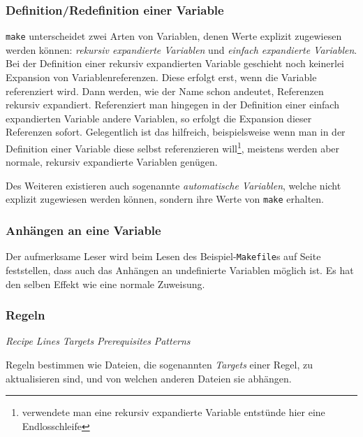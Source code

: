 	\subsubsection*{Definition/Redefinition einer Variable}
		
		\texttt{make} unterscheidet zwei Arten von Variablen, denen Werte
		explizit zugewiesen werden können: \emph{rekursiv expandierte Variablen}
		und \emph{einfach expandierte Variablen}.
		Bei der Definition einer rekursiv expandierten Variable geschieht noch
		keinerlei Expansion von Variablenreferenzen. Diese erfolgt erst, wenn
		die Variable referenziert wird. Dann werden, wie der Name schon
		andeutet, Referenzen rekursiv expandiert.
		Referenziert man hingegen in der Definition einer einfach expandierten
		Variable andere Variablen, so erfolgt die Expansion dieser Referenzen
		sofort. Gelegentlich ist das hilfreich, beispielsweise wenn man in der
		Definition einer Variable diese selbst referenzieren
		will\footnote{verwendete man eine rekursiv expandierte Variable
		entstünde hier eine Endlosschleife}, meistens werden aber normale,
		rekursiv expandierte Variablen genügen.
		
		Des Weiteren existieren auch sogenannte \emph{automatische Variablen},
		welche nicht explizit zugewiesen werden können, sondern ihre Werte von
		\texttt{make} erhalten.

	\subsubsection*{Anhängen an eine Variable}
		
		Der aufmerksame Leser wird beim Lesen des Beispiel-\texttt{Makefile}s
		auf Seite~\pageref{subsubsection:examplemakefile} feststellen, dass
		auch das Anhängen an undefinierte Variablen möglich ist. Es hat den
		selben Effekt wie eine normale Zuweisung.

	\subsubsection*{Regeln}
		
		\textit{Recipe Lines} 
		\textit{Targets} 
		\textit{Prerequisites} 
		\textit{Patterns} 

		Regeln bestimmen wie Dateien, die sogenannten \emph{Targets} einer
		Regel, zu aktualisieren sind, und von welchen anderen Dateien sie
		abhängen.
		
